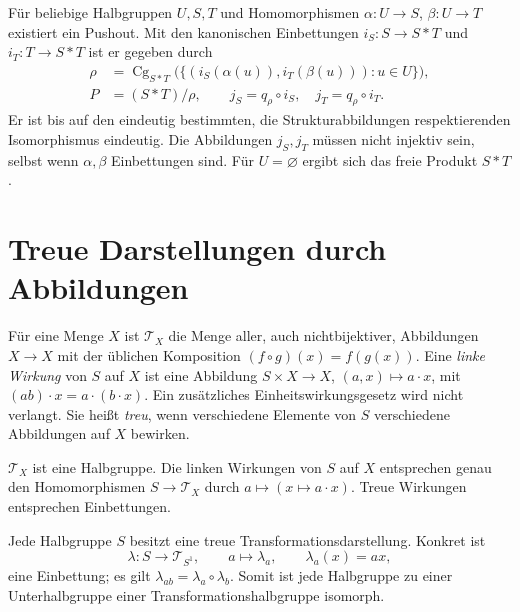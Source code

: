 \begin{theorem}
\label{b28guide:thm:pushout}
Für beliebige Halbgruppen $U,S,T$ und Homomorphismen
$\alpha:U\to S$, $\beta:U\to T$ existiert ein Pushout.
Mit den kanonischen Einbettungen $i_S:S\to S*T$ und $i_T:T\to S*T$
ist er gegeben durch
\[
\begin{aligned}
 \rho&=\operatorname{Cg}_{S*T}
 \bigl(\{(i_S(\alpha(u)),i_T(\beta(u))):u\in U\}\bigr),\\
 P&=(S*T)/\rho,\qquad
 j_S=q_\rho\circ i_S,\quad j_T=q_\rho\circ i_T.
\end{aligned}
\]
Er ist bis auf den eindeutig bestimmten, die Strukturabbildungen
respektierenden Isomorphismus eindeutig.
Die Abbildungen $j_S,j_T$ müssen nicht injektiv sein,
selbst wenn $\alpha,\beta$ Einbettungen sind.
Für $U=\varnothing$ ergibt sich das freie Produkt $S*T$.
\cite{howie1968}
\end{theorem}

\section{Treue Darstellungen durch Abbildungen}

\begin{definition}
Für eine Menge $X$ ist $\mathcal T_X$ die Menge aller, auch
nichtbijektiver, Abbildungen $X\to X$ mit der üblichen Komposition
$(f\circ g)(x)=f(g(x))$.
Eine \emph{linke Wirkung} von $S$ auf $X$ ist eine Abbildung
$S\times X\to X$, $(a,x)\mapsto a\cdot x$, mit
$(ab)\cdot x=a\cdot(b\cdot x)$.
Ein zusätzliches Einheitswirkungsgesetz wird nicht verlangt.
Sie heißt \emph{treu}, wenn verschiedene Elemente von $S$
verschiedene Abbildungen auf $X$ bewirken.
\end{definition}

\begin{theorem}
$\mathcal T_X$ ist eine Halbgruppe.
Die linken Wirkungen von $S$ auf $X$ entsprechen genau den
Homomorphismen $S\to\mathcal T_X$ durch
$a\mapsto(x\mapsto a\cdot x)$.
Treue Wirkungen entsprechen Einbettungen.
\cite{gould,howie}
\end{theorem}

\begin{theorem}
\label{b28guide:thm:cayley}
Jede Halbgruppe $S$ besitzt eine treue Transformationsdarstellung.
Konkret ist
\[
 \lambda:S\longrightarrow\mathcal T_{S^1},\qquad
 a\longmapsto\lambda_a,\qquad \lambda_a(x)=ax,
\]
eine Einbettung; es gilt $\lambda_{ab}=\lambda_a\circ\lambda_b$.
Somit ist jede Halbgruppe zu einer Unterhalbgruppe einer
Transformationshalbgruppe isomorph.
\cite{harju,gould}
\end{theorem}

